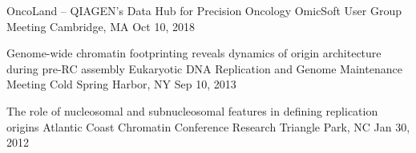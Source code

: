 

\begin{presentations}


  \presentation
    {OncoLand -- QIAGEN's Data Hub for Precision Oncology}
    {OmicSoft User Group Meeting} %
    {Cambridge, MA} %
    {Oct 10, 2018} %

  \presentation
    {Genome-wide chromatin footprinting reveals dynamics of origin architecture during pre-RC assembly}
    {Eukaryotic DNA Replication and Genome Maintenance Meeting} %
    {Cold Spring Harbor, NY} %
    {Sep 10, 2013} %

  \presentation
    {The role of nucleosomal and subnucleosomal features in defining replication origins}
    {Atlantic Coast Chromatin Conference} %
    {Research Triangle Park, NC} %
    {Jan 30, 2012} %


\end{presentations}
